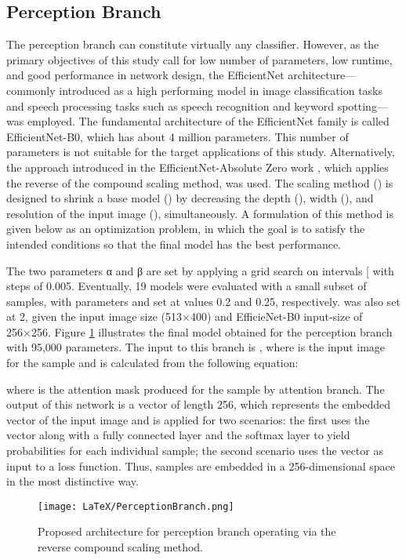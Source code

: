 \documentclass[a4paper]{article}
\begin{document}
\subsection{Perception Branch}
The perception branch can constitute virtually any classifier. However, as the primary objectives of this study call for low number of parameters, low runtime, and good performance in network design, the EfficientNet architecture—commonly introduced as a high performing model in image classification tasks and speech processing tasks such as speech recognition and keyword spotting—was employed. The fundamental architecture of the EfficientNet family is called EfficientNet-B0, which has about 4 million parameters. This number of parameters is not suitable for the target applications of this study. Alternatively, the approach introduced in the EfficientNet-Absolute Zero work \cite{21rostami2020efficientnet}, which applies the reverse of the compound scaling method, was used. The scaling method () is designed to shrink a base model () by decreasing the depth (), width (), and resolution of the input image (), simultaneously. A formulation of this method is given below as an optimization problem, in which the goal is to satisfy the intended conditions so that the final model has the best performance.

The two parameters α and β are set by applying a grid search on intervals [ with steps of 0.005. Eventually, 19 models were evaluated with a small subset of samples, with parameters  and  set at values 0.2 and 0.25, respectively.  was also set at  2, given the input image size (513×400) and EfficieNet-B0 input-size of 256×256. Figure \ref{fig:PerceptionBranch} illustrates the final model obtained for the perception branch with 95,000 parameters.
The input to this branch is , where  is the input image for the  sample and is calculated from the following equation:

where  is the attention mask produced for the  sample by attention branch. The output of this network is a vector of length 256, which represents the embedded vector of the input image and is applied for two scenarios: the first uses the vector along with a fully connected layer and the softmax layer to yield probabilities for each individual sample; the second scenario uses the vector as input to a loss function. Thus, samples are embedded in a 256-dimensional space in the most distinctive way.
\begin{figure}[t]
  \centering
  \texttt{[image: LaTeX/PerceptionBranch.png]}
  \caption{Proposed architecture for perception branch operating via the reverse compound scaling method.}
  \label{fig:PerceptionBranch}
\end{figure}
\end{document}
